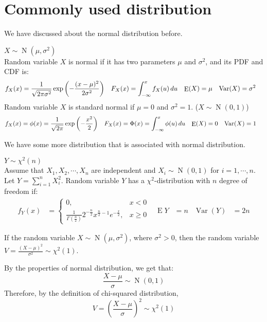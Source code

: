 \documentclass{huhtakm-template-book-v2}
\DeclareMathOperator{\E}{E}
\DeclareMathOperator{\Var}{Var}
\DeclareMathOperator{\N}{N}
\begin{document}
\section{Commonly used distribution}
We have discussed about the normal distribution before.
\begin{eg} $X\sim\N(\mu,\sigma^{2})$\\
	Random variable $X$ is normal if it has two parameters $\mu$ and $\sigma^{2}$, and its PDF and CDF is:
	\begin{align*}
		f_{X}(x)&=\frac{1}{\sqrt{2\pi\sigma^{2}}}\exp\left(-\frac{(x-\mu)^{2}}{2\sigma^{2}}\right) & F_{X}(x)&=\intlu{-\infty}{x}f_{X}(u)\,du & \E(X)&=\mu & \Var(X)&=\sigma^{2}
	\end{align*}
	Random variable $X$ is standard normal if $\mu=0$ and $\sigma^{2}=1$. ($X\sim\N(0,1)$)
	\begin{align*}
		f_{X}(x)&=\phi(x)=\frac{1}{\sqrt{2\pi}}\exp\left(-\frac{x^{2}}{2}\right) & F_{X}(x)&=\Phi(x)=\intlu{-\infty}{x}\phi(u)\,du & \E(X)&=0 & \Var(X)&=1
	\end{align*}
\end{eg}
We have some more distribution that is associated with normal distribution.
\begin{eg} $Y\sim\chi^{2}(n)$\\
	Assume that $X_{1},X_{2},\cdots,X_{n}$ are independent and $X_{i}\sim\N(0,1)$ for $i=1,\cdots,n$. Let $Y=\sum_{i=1}^{n}X_{i}^{2}$. Random variable $Y$ has a $\chi^{2}$-distribution with $n$ degree of freedom if:
	\begin{align*}
		f_{Y}(x)&=\begin{cases}
			0, &x<0\\
			\frac{1}{\Gamma(\frac{n}{2})}2^{-\frac{n}{2}}x^{\frac{n}{2}-1}e^{-\frac{x}{2}}, &x\geq 0
		\end{cases} & \E{Y}&=n & \Var(Y)&=2n
	\end{align*}
\end{eg} 
\begin{thm}
	\label{Chapter 1 (Theorem) chi-square distribution with 1 degree of freedom}
	If the random variable $X\sim\N(\mu,\sigma^{2})$, where $\sigma^{2}>0$, then the random variable $V=\frac{(X-\mu)^{2}}{\sigma^{2}}\sim\chi^{2}(1)$.
\end{thm}
\begin{proofing}
	By the properties of normal distribution, we get that:
	\begin{equation*}
		\frac{X-\mu}{\sigma}\sim\N(0,1)
	\end{equation*}
	Therefore, by the definition of chi-squared distribution,
	\begin{equation*}
		V=\left(\frac{X-\mu}{\sigma}\right)^{2}\sim\chi^{2}(1)
	\end{equation*}
\end{proofing}
\end{document}
